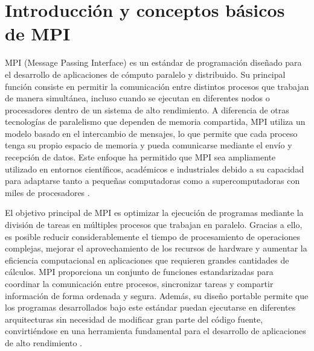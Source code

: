 

\section{Introducción y conceptos básicos de MPI}

MPI (Message Passing Interface) es un estándar de programación diseñado para el desarrollo de aplicaciones de cómputo paralelo y distribuido. Su principal función consiste en permitir la comunicación entre distintos procesos que trabajan de manera simultánea, incluso cuando se ejecutan en diferentes nodos o procesadores dentro de un sistema de alto rendimiento. A diferencia de otras tecnologías de paralelismo que dependen de memoria compartida, MPI utiliza un modelo basado en el intercambio de mensajes, lo que permite que cada proceso tenga su propio espacio de memoria y pueda comunicarse mediante el envío y recepción de datos. Este enfoque ha permitido que MPI sea ampliamente utilizado en entornos científicos, académicos e industriales debido a su capacidad para adaptarse tanto a pequeñas computadoras como a supercomputadoras con miles de procesadores \cite{ref1_frem,ref6_frem}.

El objetivo principal de MPI es optimizar la ejecución de programas mediante la división de tareas en múltiples procesos que trabajan en paralelo. Gracias a ello, es posible reducir considerablemente el tiempo de procesamiento de operaciones complejas, mejorar el aprovechamiento de los recursos de hardware y aumentar la eficiencia computacional en aplicaciones que requieren grandes cantidades de cálculos. MPI proporciona un conjunto de funciones estandarizadas para coordinar la comunicación entre procesos, sincronizar tareas y compartir información de forma ordenada y segura. Además, su diseño portable permite que los programas desarrollados bajo este estándar puedan ejecutarse en diferentes arquitecturas sin necesidad de modificar gran parte del código fuente, convirtiéndose en una herramienta fundamental para el desarrollo de aplicaciones de alto rendimiento \cite{ref2_frem,ref3_frem}.

